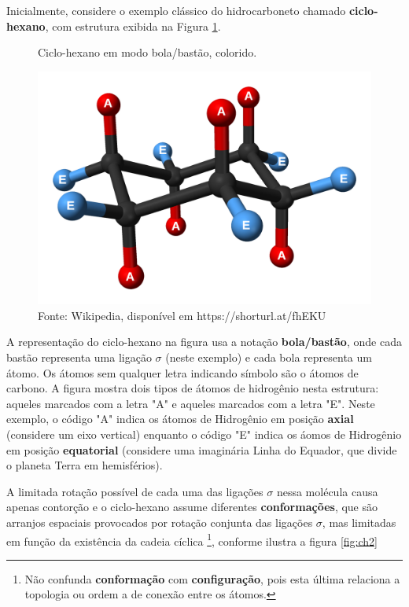 Inicialmente, considere o exemplo clássico do hidrocarboneto chamado \textbf{ciclo-hexano}, com estrutura exibida na Figura \ref{fig:ch}.

\begin{figure}[h]
\centering
\caption{Ciclo-hexano em modo bola/bastão, colorido.}
\vspace{0.25cm}
\label{fig:ch}
\includegraphics[width=0.6\linewidth]{imagens/Cyclohexane-chair-colour-coded-3D-balls.png}
\caption*{Fonte: Wikipedia, disponível em https://shorturl.at/fhEKU}
\end{figure}

A representação do ciclo-hexano na figura usa a notação \textbf{bola/bastão}, onde cada bastão representa uma ligação $\sigma$ (neste exemplo) e cada bola representa um átomo. Os átomos sem qualquer letra indicando símbolo são o átomos de carbono. A figura mostra dois tipos de átomos de hidrogênio nesta estrutura: aqueles marcados com a letra "A" e aqueles marcados com a letra "E". Neste exemplo, o código "A" indica os átomos de Hidrogênio em posição \textbf{axial} (considere um eixo vertical) enquanto o código "E" indica os áomos de Hidrogênio em posição \textbf{equatorial} (considere uma imaginária Linha do Equador, que divide o planeta Terra em hemisférios).

A limitada rotação possível de cada uma das ligações $\sigma$ nessa molécula causa apenas contorção e o ciclo-hexano assume diferentes \textbf{conformações}, que são arranjos espaciais provocados por rotação conjunta das ligações $\sigma$, mas limitadas em função da existência da cadeia cíclica \footnote{Não confunda \textbf{conformação} com \textbf{configuração}, pois esta última relaciona a topologia ou ordem a de conexão entre os átomos.}, conforme ilustra a figura \ref{fig:ch2}

